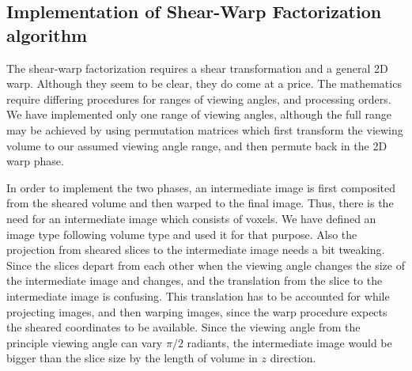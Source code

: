 \documentclass[a4paper,12pt]{article}
\begin{document}

\subsection{Implementation of Shear-Warp Factorization
  algorithm}
The shear-warp factorization requires a shear transformation and a
general 2D warp. Although they seem to be clear, they do come at a
price. The mathematics require differing procedures for ranges of
viewing angles, and processing orders. We have implemented only one
range of viewing angles, although the full range may be achieved by
using permutation matrices which first transform the viewing volume to
our assumed viewing angle range, and then permute back in the 2D warp
phase. 

In order to implement the two phases, an intermediate image is first
composited from the sheared volume and then warped to the final
image. Thus, there is the need for an intermediate image which
consists of voxels. We have defined an image type following volume
type and used it for that purpose. Also the projection from sheared
slices to the intermediate image needs a bit tweaking. Since the
slices depart from each other when the viewing angle changes the size
of the intermediate image and changes, and the translation from the slice
to the intermediate image is confusing. This translation has to be
accounted for while projecting images, and then warping images, since
the warp procedure expects the sheared coordinates to be
available. Since the viewing angle from the principle viewing angle
can vary $\pi/2$ radiants, the intermediate image would be bigger than
the slice size by the length of volume in $z$ direction. 

\end{document}
